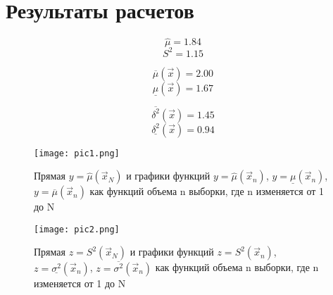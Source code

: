 \chapter{Результаты расчетов}

$$\hat{\mu} = 1.84$$
$$S^2 = 1.15$$

$$\overline{\mu}(\vec{x}) = 2.00$$
$$\underline{\mu}(\vec{x}) = 1.67$$

$$\overline{\delta^2}(\vec{x}) = 1.45$$
$$\underline{\delta^2}(\vec{x}) = 0.94$$

\begin{figure}[h]
  \centering
  \texttt{[image: pic1.png]}
  \caption{Прямая $y = \hat{\mu}(\vec{x}_N)$ и графики функций $y = \hat{\mu}(\vec{x}_n)$, $y = \underline{\mu}(\vec{x}_n)$, $y = \overline{\mu}(\vec{x}_n)$ как функций объема n выборки, где n изменяется от 1 до N}
\end{figure}

\begin{figure}[h]
  \centering
  \texttt{[image: pic2.png]}
  \caption{Прямая $z =  S^2(\vec{x}_N)$ и графики функций $z = S^2(\vec{x}_n)$, $z = \underline{\sigma^2}(\vec{x}_n)$, $z = \overline{\sigma^2}(\vec{x}_n)$ как функций объема n выборки, где n изменяется от 1 до N}
\end{figure}